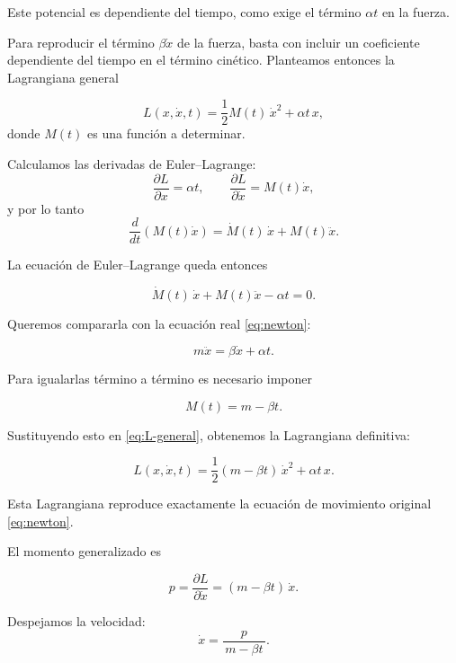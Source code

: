 \documentclass{article}
\begin{document}
Este potencial es dependiente del tiempo, como exige el término $\alpha t$ en la fuerza.


Para reproducir el término $\beta\dot x$ de la fuerza, basta con incluir un  
coeficiente dependiente del tiempo en el término cinético.  
Planteamos entonces la Lagrangiana general

\begin{equation}
L(x,\dot x,t)
=
\frac{1}{2}M(t)\,\dot x^{2} + \alpha t\,x,
\label{eq:L-general}
\end{equation}
donde $M(t)$ es una función a determinar.

Calculamos las derivadas de Euler–Lagrange:
\[
\frac{\partial L}{\partial x} = \alpha t,
\qquad
\frac{\partial L}{\partial\dot x} = M(t)\dot x,
\]
y por lo tanto
\[
\frac{d}{dt}\left( M(t)\dot x \right)
= \dot M(t)\,\dot x + M(t)\ddot x.
\]

La ecuación de Euler–Lagrange queda entonces

\begin{equation}
\dot M(t)\,\dot x + M(t)\ddot x - \alpha t =0.
\label{eq:ELM}
\end{equation}

Queremos compararla con la ecuación real \eqref{eq:newton}:

\[
m\ddot x = \beta\dot x + \alpha t.
\]

Para igualarlas término a término es necesario imponer

\[
M(t) = m - \beta t.
\]

Sustituyendo esto en \eqref{eq:L-general}, obtenemos la Lagrangiana definitiva:

\begin{equation}
L(x,\dot x,t)
=
\frac{1}{2}(m-\beta t)\,\dot x^{2}
+ \alpha t\,x.
\label{eq:L-final}
\end{equation}

Esta Lagrangiana reproduce exactamente la ecuación de movimiento original \eqref{eq:newton}.



El momento generalizado es

\begin{equation}
p
= \frac{\partial L}{\partial\dot x}
= (m - \beta t)\,\dot x.
\label{eq:p}
\end{equation}

Despejamos la velocidad:
\begin{equation}
\dot x = 
\frac{p}{\,m-\beta t\,}.
\label{eq:xdot}
\end{equation}
\end{document}
